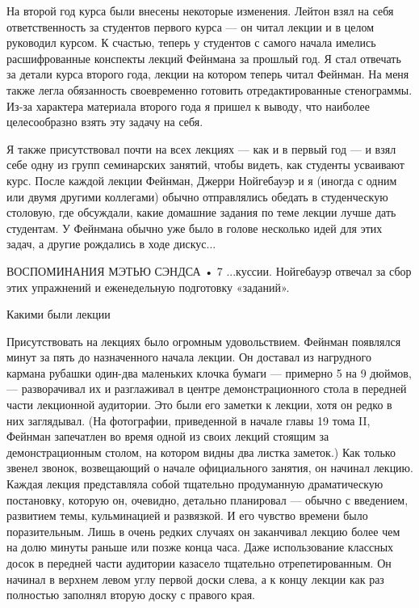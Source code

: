 \documentclass[11pt,oneside]{article}
\begin{document}
На второй год курса были внесены некоторые изменения. Лейтон взял на себя ответственность за студентов первого курса --- он читал лекции и в целом руководил курсом. К счастью, теперь у студентов с самого начала имелись расшифрованные конспекты лекций Фейнмана за прошлый год. Я стал отвечать за детали курса второго года, лекции на котором теперь читал Фейнман. На меня также легла обязанность своевременно готовить отредактированные стенограммы. Из-за характера материала второго года я пришел к выводу, что наиболее целесообразно взять эту задачу на себя.\par



Я также присутствовал почти на всех лекциях --- как и в первый год --- и взял себе одну из групп семинарских занятий, чтобы видеть, как студенты усваивают курс. После каждой лекции Фейнман, Джерри Нойгебауэр и я (иногда с одним или двумя другими коллегами) обычно отправлялись обедать в студенческую столовую, где обсуждали, какие домашние задания по теме лекции лучше дать студентам. У Фейнмана обычно уже было в голове несколько идей для этих задач, а другие рождались в ходе дискус...\par



ВОСПОМИНАНИЯ МЭТЬЮ СЭНДСА • 7 ...куссии. Нойгебауэр отвечал за сбор этих упражнений и еженедельную подготовку «заданий».\par



Какими были лекции\par



Присутствовать на лекциях было огромным удовольствием. Фейнман появлялся минут за пять до назначенного начала лекции. Он доставал из нагрудного кармана рубашки один-два маленьких клочка бумаги --- примерно 5 на 9 дюймов, --- разворачивал их и разглаживал в центре демонстрационного стола в передней части лекционной аудитории. Это были его заметки к лекции, хотя он редко в них заглядывал. (На фотографии, приведенной в начале главы 19 тома II, Фейнман запечатлен во время одной из своих лекций стоящим за демонстрационным столом, на котором видны два листка заметок.) Как только звенел звонок, возвещающий о начале официального занятия, он начинал лекцию. Каждая лекция представляла собой тщательно продуманную драматическую постановку, которую он, очевидно, детально планировал --- обычно с введением, развитием темы, кульминацией и развязкой. И его чувство времени было поразительным. Лишь в очень редких случаях он заканчивал лекцию более чем на долю минуты раньше или позже конца часа. Даже использование классных досок в передней части аудитории казасело тщательно отрепетированным. Он начинал в верхнем левом углу первой доски слева, а к концу лекции как раз полностью заполнял вторую доску с правого края.\par
\end{document}

